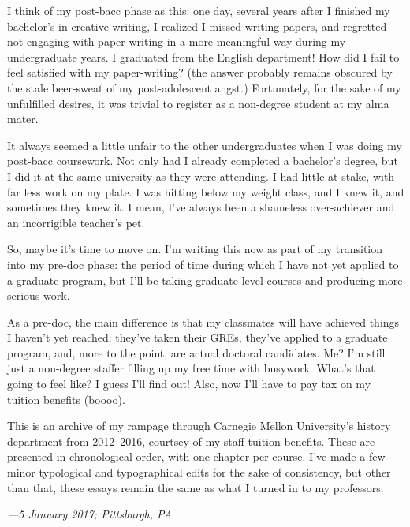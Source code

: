 I think of my post-bacc phase as this: one day, several years after I finished
my bachelor's in creative writing, I realized I missed writing papers, and
regretted not engaging with paper-writing in a more meaningful way during my
undergraduate years. I graduated from the English department! How did I fail to
feel satisfied with my paper-writing? (the answer probably remains obscured by
the stale beer-sweat of my post-adolescent angst.) Fortunately, for the sake of
my unfulfilled desires, it was trivial to register as a non-degree student at my
alma mater.

It always seemed a little unfair to the other undergraduates when I was doing my
post-bacc coursework. Not only had I already completed a bachelor's degree, but
I did it at the same university as they were attending. I had little at stake,
with far less work on my plate. I was hitting below my weight class, and I
knew it, and sometimes they knew it. I mean, I've always been a shameless
over-achiever and an incorrigible teacher's pet.

So, maybe it's time to move on. I'm writing this now as part of my transition
into my pre-doc phase: the period of time during which I have not yet applied to
a graduate program, but I'll be taking graduate-level courses and producing more
serious work.

As a pre-doc, the main difference is that my classmates will have achieved
things I haven't yet reached: they've taken their GREs, they've applied to a
graduate program, and, more to the point, are actual doctoral candidates. Me?
I'm still just a non-degree staffer filling up my free time with busywork.
What's that going to feel like? I guess I'll find out! Also, now I'll have to
pay tax on my tuition benefits (boooo).

This is an archive of my rampage through Carnegie Mellon University's history
department from 2012--2016, courtsey of my staff tuition benefits. These are
presented in chronological order, with one chapter per course. I've made a few
minor typological and typographical edits for the sake of consistency, but other
than that, these essays remain the same as what I turned in to my professors.

\textit{---5 January 2017; Pittsburgh, PA}
